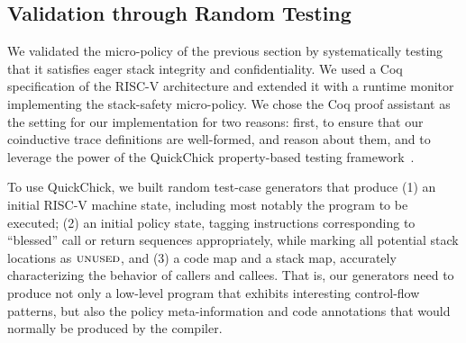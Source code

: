 \documentclass[acmsmall,review,anonymous]{acmart}\settopmatter{printfolios=true,printccs=false,printacmref=false}
\begin{document}


\subsection*{Validation through Random Testing}
\label{sec:testing}

We validated the micro-policy of the previous section by systematically
testing that it satisfies eager stack integrity and
confidentiality. We used a Coq specification of the RISC-V
architecture  and
extended it with a runtime monitor implementing the stack-safety
micro-policy. We chose the
Coq proof assistant as the setting for our implementation for two
reasons: first, to ensure that our coinductive trace definitions are
well-formed, and reason about them, and to leverage the power of the QuickChick
property-based testing framework~\citep{Pierce:SF4}.

To use QuickChick, we built random test-case generators that produce
(1) an initial RISC-V machine state, including most notably
  the program to be executed;
(2)
  an initial policy state, tagging instructions corresponding to
  ``blessed'' call or return sequences appropriately, while marking
  all potential stack locations as $\textsc{unused}$, and
(3)
 a code map and a stack map, accurately characterizing the behavior
  of callers and callees.
%
That is, our generators need to produce not only a low-level program
that exhibits interesting control-flow patterns, but also the policy
meta-information and code annotations that would normally be produced
by the compiler.
\end{document}
